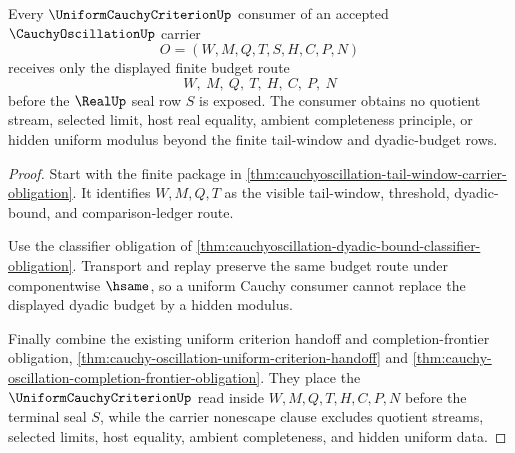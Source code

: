 \begin{theorem}
\label{thm:cauchyoscillation-uniform-cauchy-consumer-obligation}
Every $\UniformCauchyCriterionUp$ consumer of an accepted $\CauchyOscillationUp$ carrier
$$
O=(W,M,Q,T,S,H,C,P,N)
$$
receives only the displayed finite budget route
$$
W,\ M,\ Q,\ T,\ H,\ C,\ P,\ N
$$
before the $\RealUp$ seal row $S$ is exposed. The consumer obtains no quotient stream, selected limit, host real equality, ambient completeness principle, or hidden uniform modulus beyond the finite tail-window and dyadic-budget rows.
\end{theorem}
\begin{proof}
Start with the finite package in \autoref{thm:cauchyoscillation-tail-window-carrier-obligation}. It identifies $W,M,Q,T$ as the visible tail-window, threshold, dyadic-bound, and comparison-ledger route.

Use the classifier obligation of \autoref{thm:cauchyoscillation-dyadic-bound-classifier-obligation}. Transport and replay preserve the same budget route under componentwise $\hsame$, so a uniform Cauchy consumer cannot replace the displayed dyadic budget by a hidden modulus.

Finally combine the existing uniform criterion handoff and completion-frontier obligation, \autoref{thm:cauchy-oscillation-uniform-criterion-handoff} and \autoref{thm:cauchy-oscillation-completion-frontier-obligation}. They place the $\UniformCauchyCriterionUp$ read inside $W,M,Q,T,H,C,P,N$ before the terminal seal $S$, while the carrier nonescape clause excludes quotient streams, selected limits, host equality, ambient completeness, and hidden uniform data.
\end{proof}

